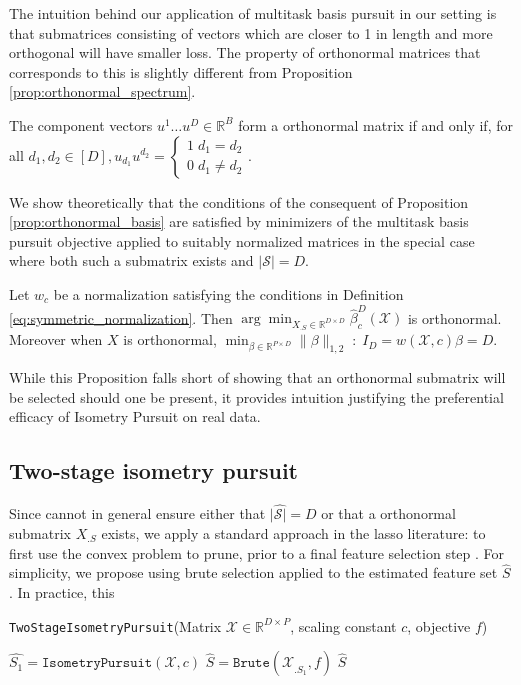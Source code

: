 The intuition behind our application of multitask basis pursuit in our setting is that submatrices consisting of vectors which are closer to 1 in length and more orthogonal will have smaller loss.
The property of orthonormal matrices that corresponds to this is slightly different from Proposition \ref{prop:orthonormal_spectrum}.
\begin{proposition}
\label{prop:orthonormal_basis}
The component vectors $u^1 \dots u^D \in \mathbb R^B$ form a orthonormal matrix if and only if, for all $d_1, d_2 \in [D], u_{d_1} u^{d_2} = \begin{cases}
1 \; d_1 = d_2\\ 
0 \; d_1 \neq d_2 
\end{cases}$.
\end{proposition}
We show theoretically that the conditions of the consequent of Proposition \ref{prop:orthonormal_basis} are satisfied by minimizers of the multitask basis pursuit objective applied to suitably normalized matrices in the special case where both such a submatrix exists and $|\mathcal S| = D$.
\begin{proposition}
Let $w_c$ be a normalization satisfying the conditions in Definition \ref{eq:symmetric_normalization}.  Then $\arg \min_{X_{.S} \in \mathbb R^{D \times D}} \widehat \beta^{D}_c (\mathcal X) $ is orthonormal.  Moreover when $X$ is orthonormal, $\min_{\beta \in \mathbb R^{P \times D}} \| \beta \|_{1,2} \; : \; I_D = w ({ \mathcal X}, c) \beta = D$.
\label{prop:unitary_selection}
\end{proposition}
While this Proposition falls short of showing that an orthonormal submatrix will be selected should one be present, it provides intuition justifying the preferential efficacy of Isometry Pursuit on real data.

\subsection{Two-stage isometry pursuit}

Since cannot in general ensure either that $|\widehat { \mathcal S|} = D$ or that a orthonormal submatrix $X_{.S}$ exists, we apply a standard approach in the lasso literature: to first use the convex problem to prune, prior to a final feature selection step \cite{Hesterberg2008-iy}.
For simplicity, we propose using brute selection applied to the estimated feature set $\widehat S$.
In practice, this 

\begin{algorithm}[H]
\caption{\texttt{TwoStageIsometryPursuit}(Matrix $\mathcal{X} \in \mathbb{R}^{D \times P}$, scaling constant $c$, objective $f$)}
\begin{algorithmic}[1]
\STATE $\widehat{S_1} = \texttt{IsometryPursuit}(\mathcal X, c)$
\STATE $\widehat{S} = \texttt{Brute}(\mathcal{X}_{.\widehat{S_1}}, f)$
 $\widehat{S}$
\end{algorithmic}
\end{algorithm}




